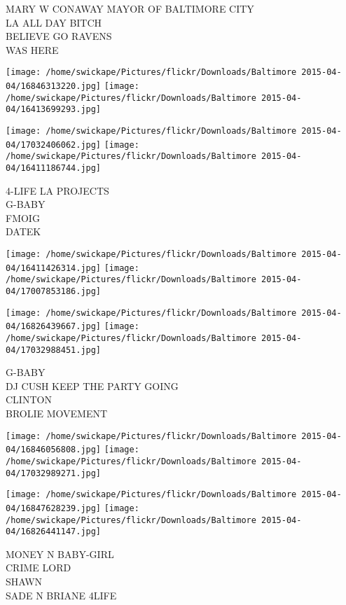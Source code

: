 \documentclass[10pt,letterpaper]{article}
\begin{document}
MARY W CONAWAY MAYOR OF BALTIMORE CITY\\
LA ALL DAY BITCH\\
BELIEVE GO RAVENS\\
WAS HERE\\
\pagebreak

\texttt{[image: /home/swickape/Pictures/flickr/Downloads/Baltimore 2015-04-04/16846313220.jpg]}
\texttt{[image: /home/swickape/Pictures/flickr/Downloads/Baltimore 2015-04-04/16413699293.jpg]}

\texttt{[image: /home/swickape/Pictures/flickr/Downloads/Baltimore 2015-04-04/17032406062.jpg]}
\texttt{[image: /home/swickape/Pictures/flickr/Downloads/Baltimore 2015-04-04/16411186744.jpg]}

4{-}LIFE LA PROJECTS\\
G{-}BABY\\
FMOIG\\
DATEK\\
\pagebreak

\texttt{[image: /home/swickape/Pictures/flickr/Downloads/Baltimore 2015-04-04/16411426314.jpg]}
\texttt{[image: /home/swickape/Pictures/flickr/Downloads/Baltimore 2015-04-04/17007853186.jpg]}

\texttt{[image: /home/swickape/Pictures/flickr/Downloads/Baltimore 2015-04-04/16826439667.jpg]}
\texttt{[image: /home/swickape/Pictures/flickr/Downloads/Baltimore 2015-04-04/17032988451.jpg]}

G{-}BABY\\
DJ CUSH KEEP THE PARTY GOING\\
CLINTON\\
BROLIE MOVEMENT\\
\pagebreak

\texttt{[image: /home/swickape/Pictures/flickr/Downloads/Baltimore 2015-04-04/16846056808.jpg]}
\texttt{[image: /home/swickape/Pictures/flickr/Downloads/Baltimore 2015-04-04/17032989271.jpg]}

\texttt{[image: /home/swickape/Pictures/flickr/Downloads/Baltimore 2015-04-04/16847628239.jpg]}
\texttt{[image: /home/swickape/Pictures/flickr/Downloads/Baltimore 2015-04-04/16826441147.jpg]}

MONEY N BABY{-}GIRL\\
CRIME LORD\\
SHAWN\\
SADE N BRIANE 4LIFE\\
\pagebreak
\end{document}
